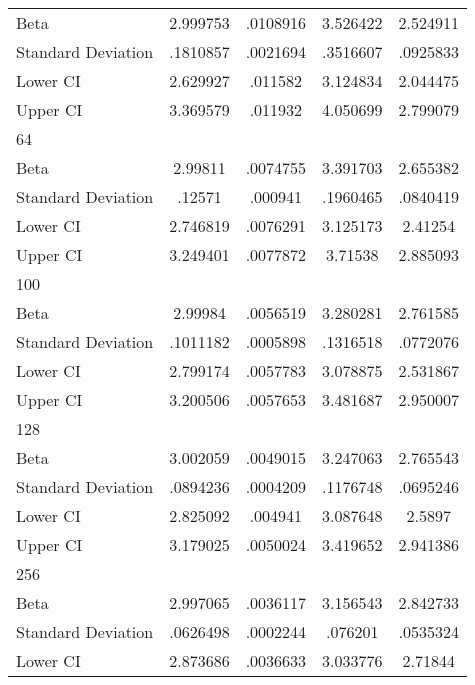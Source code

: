 {\begin{tabular}{l*{1}{cccc}}
Beta                &    2.999753&    .0108916&    3.526422&    2.524911\\
Standard Deviation  &    .1810857&    .0021694&    .3516607&    .0925833\\
Lower CI            &    2.629927&     .011582&    3.124834&    2.044475\\
Upper CI            &    3.369579&     .011932&    4.050699&    2.799079\\
\hline
64                  &            &            &            &            \\
Beta                &     2.99811&    .0074755&    3.391703&    2.655382\\
Standard Deviation  &      .12571&     .000941&    .1960465&    .0840419\\
Lower CI            &    2.746819&    .0076291&    3.125173&     2.41254\\
Upper CI            &    3.249401&    .0077872&     3.71538&    2.885093\\
\hline
100                 &            &            &            &            \\
Beta                &     2.99984&    .0056519&    3.280281&    2.761585\\
Standard Deviation  &    .1011182&    .0005898&    .1316518&    .0772076\\
Lower CI            &    2.799174&    .0057783&    3.078875&    2.531867\\
Upper CI            &    3.200506&    .0057653&    3.481687&    2.950007\\
\hline
128                 &            &            &            &            \\
Beta                &    3.002059&    .0049015&    3.247063&    2.765543\\
Standard Deviation  &    .0894236&    .0004209&    .1176748&    .0695246\\
Lower CI            &    2.825092&     .004941&    3.087648&      2.5897\\
Upper CI            &    3.179025&    .0050024&    3.419652&    2.941386\\
\hline
256                 &            &            &            &            \\
Beta                &    2.997065&    .0036117&    3.156543&    2.842733\\
Standard Deviation  &    .0626498&    .0002244&     .076201&    .0535324\\
Lower CI            &    2.873686&    .0036633&    3.033776&     2.71844\\

\end{tabular}}
